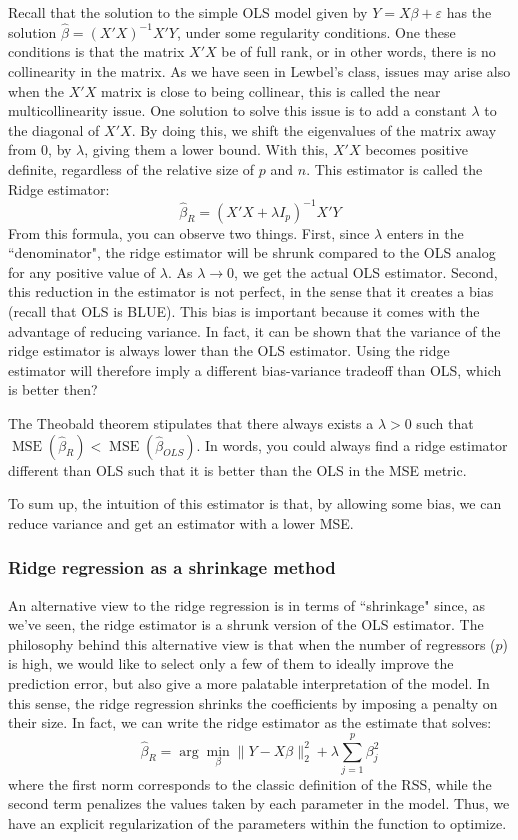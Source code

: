 \documentclass[12pt]{report}
\begin{document}
Recall that the solution to the simple OLS model given by $Y = X\beta + \varepsilon$ has the solution $\hat\beta = (X'X)^{-1}X'Y$, under some regularity conditions. One these conditions is that the matrix $X'X$ be of full rank, or in other words, there is no collinearity in the matrix. As we have seen in Lewbel's class, issues may arise also when the $X'X$ matrix is close to being collinear, this is called the near multicollinearity issue. One solution to solve this issue is to add a constant $\lambda$ to the diagonal of $X'X$. By doing this, we shift the eigenvalues of the matrix away from 0, by $\lambda$, giving them a lower bound. With this, $X'X$ becomes positive definite, regardless of the relative size of $p$ and $n$. This estimator is called the Ridge estimator: $$\hat{\beta}_{R} = (X'X + \lambda I_p)^{-1}X'Y $$
From this formula, you can observe two things. First, since $\lambda$ enters in the ``denominator", the ridge estimator will be shrunk compared to the OLS analog for any positive value of $\lambda$. As $\lambda\to 0$, we get the actual OLS estimator. Second, this reduction in the estimator is not perfect, in the sense that it creates a bias (recall that OLS is BLUE). This bias is important because it comes with the advantage of reducing variance. In fact, it can be shown that the variance of the ridge estimator is always lower than the OLS estimator. Using the ridge estimator will therefore imply a different bias-variance tradeoff than OLS, which is better then?

The Theobald theorem stipulates that there always exists a $\lambda > 0$ such that $\operatorname{MSE}(\hat\beta_R) < \operatorname{MSE}(\hat\beta_{OLS})$. In words, you could always find a ridge estimator different than OLS such that it is better than the OLS in the MSE metric.

To sum up, the intuition of this estimator is that, by allowing some bias, we can reduce variance and get an estimator with a lower MSE.

\subsubsection{Ridge regression as a shrinkage method}

An alternative view to the ridge regression is in terms of ``shrinkage" since, as we've seen, the ridge estimator is a shrunk version of the OLS estimator. The philosophy behind this alternative view is that when the number of regressors ($p$) is high, we would like to select only a few of them to ideally improve the prediction error, but also give a more palatable interpretation of the model. In this sense, the ridge regression shrinks the coefficients by imposing a penalty on their size. In fact, we can write the ridge estimator as the estimate that solves: $$\hat\beta_R = \arg\min_\beta \lVert Y - X\beta \rVert_2^2 + \lambda\sum_{j=1}^p\beta_j^2 $$ where the first norm corresponds to the classic definition of the RSS, while the second term penalizes the values taken by each parameter in the model. Thus, we have an explicit regularization of the parameters within the function to optimize.
\end{document}
